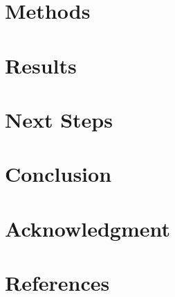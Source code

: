 \documentclass[journal,twoside,web]{ieeecolor}
\begin{document}
\section{Methods}
\label{sec:methods}

\section{Results}
\label{sec:results}

\section{Next Steps}
\label{sec:next steps}

\section{Conclusion}
\label{sec:conclusion}

\section*{Acknowledgment}

\section*{References}
\end{document}
